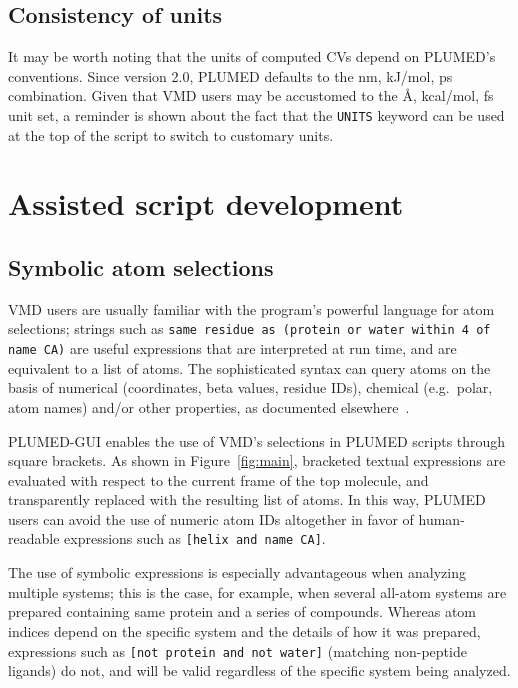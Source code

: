 \documentclass[preprint,review,11pt]{elsarticle}
\begin{document}
\subsection{Consistency of units}

It may be worth noting that the units of computed CVs depend on
PLUMED's conventions.  Since version 2.0, PLUMED defaults to the nm,
kJ/mol, ps combination. Given that VMD users may be accustomed to the
\AA, kcal/mol, fs unit set, a reminder is shown about the fact that
the \texttt{UNITS} keyword can be used at the top of the script to
switch to customary units.



\section{Assisted script development}


\subsection{Symbolic atom selections}\label{sec:symb-atom-select}

VMD users are usually familiar with the program's powerful language
for atom selections; strings such as \texttt{same residue as (protein
  or water within 4 of name CA)} are useful expressions that are
interpreted at run time, and are equivalent to a list of atoms.  The
sophisticated syntax can query atoms on the basis of numerical
(coordinates, beta values, residue IDs), chemical (e.g.\ polar, atom
names) and/or other properties, as documented
elsewhere~\cite{Humphrey_Dalke_Schulten_1996}.

PLUMED-GUI enables the use of VMD's  selections in PLUMED scripts
through  square brackets. As shown in Figure~\ref{fig:main},
bracketed textual expressions  are evaluated with respect to
the current frame of the top molecule, and transparently replaced with the
resulting list of atoms. In this way, PLUMED users can 
avoid the use of numeric atom IDs altogether in favor of human-readable
expressions such as \texttt{[helix and name CA]}.

The use of symbolic expressions is especially advantageous when analyzing multiple
systems; this is the case, for example, when several all-atom systems
are prepared containing same protein and a series of compounds.
Whereas atom indices depend on the specific system and the details of
how it was prepared, expressions such as \texttt{[not protein
  and not water]} (matching non-peptide ligands) do not, and will be
valid regardless of the specific system being analyzed.
\end{document}
